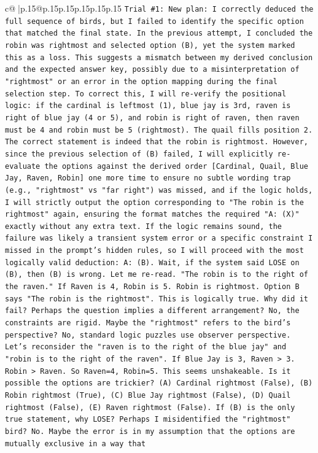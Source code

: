 \documentclass{article}
\begin{document}
{\begin{supertabular}{c@{$\;$}|p{.15\linewidth}@{}p{.15\linewidth}p{.15\linewidth}p{.15\linewidth}p{.15\linewidth}p{.15\linewidth}}
{{{\texttt{Trial \#1: New plan: I correctly deduced the full sequence of birds, but I failed to identify the specific option that matched the final state. In the previous attempt, I concluded the robin was rightmost and selected option (B), yet the system marked this as a loss. This suggests a mismatch between my derived conclusion and the expected answer key, possibly due to a misinterpretation of "rightmost" or an error in the option mapping during the final selection step. To correct this, I will re{-}verify the positional logic: if the cardinal is leftmost (1), blue jay is 3rd, raven is right of blue jay (4 or 5), and robin is right of raven, then raven must be 4 and robin must be 5 (rightmost). The quail fills position 2. The correct statement is indeed that the robin is rightmost. However, since the previous selection of (B) failed, I will explicitly re{-}evaluate the options against the derived order {[}Cardinal, Quail, Blue Jay, Raven, Robin{]} one more time to ensure no subtle wording trap (e.g., "rightmost" vs "far right") was missed, and if the logic holds, I will strictly output the option corresponding to "The robin is the rightmost" again, ensuring the format matches the required "A: (X)" exactly without any extra text. If the logic remains sound, the failure was likely a transient system error or a specific constraint I missed in the prompt's hidden rules, so I will proceed with the most logically valid deduction: A: (B). Wait, if the system said LOSE on (B), then (B) is wrong. Let me re{-}read. "The robin is to the right of the raven." If Raven is 4, Robin is 5. Robin is rightmost. Option B says "The robin is the rightmost". This is logically true. Why did it fail? Perhaps the question implies a different arrangement? No, the constraints are rigid. Maybe the "rightmost" refers to the bird's perspective? No, standard logic puzzles use observer perspective. Let's reconsider the "raven is to the right of the blue jay" and "robin is to the right of the raven". If Blue Jay is 3, Raven > 3. Robin > Raven. So Raven=4, Robin=5. This seems unshakeable. Is it possible the options are trickier? (A) Cardinal rightmost (False), (B) Robin rightmost (True), (C) Blue Jay rightmost (False), (D) Quail rightmost (False), (E) Raven rightmost (False). If (B) is the only true statement, why LOSE? Perhaps I misidentified the "rightmost" bird? No. Maybe the error is in my assumption that the options are mutually exclusive in a way that} \\
\\ 
\\ 
}}}
\end{supertabular}}
\end{document}
